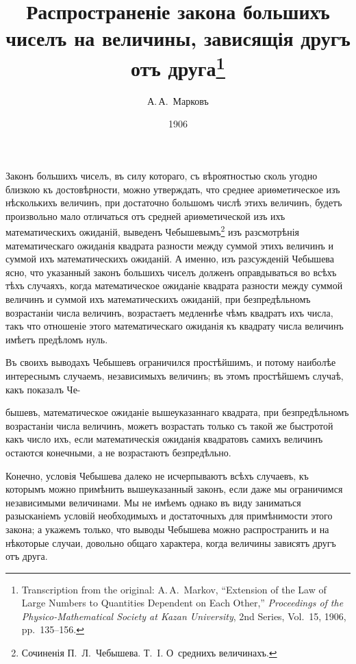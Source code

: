 \documentclass[12pt]{article}
\title{Распространеніе закона большихъ чиселъ на величины, зависящія другъ отъ друга\thanks{Transcription from the original: A.\,A.~Markov, ``Extension of the Law of Large Numbers to Quantities Dependent on Each Other,'' \textit{Proceedings of the Physico-Mathematical Society at Kazan University}, 2nd Series, Vol.~15, 1906, pp.~135--156.}}
\author{А.\,А.~Марковъ}
\date{1906}
\begin{document}
\maketitle



Законъ большихъ чиселъ, въ силу котораго, съ вѣроятностью сколь угодно близкою къ достовѣрности, можно утверждать, что среднее ариѳметическое изъ нѣсколькихъ величинъ, при достаточно большомъ числѣ этихъ величинъ, будетъ произвольно мало отличаться отъ средней ариѳметической изъ ихъ математическихъ ожиданій, выведенъ Чебышевымъ\footnote{Сочиненія П.~Л.~Чебышева. Т.~I. О~среднихъ величинахъ.} изъ разсмотрѣнія математическаго ожиданія квадрата разности между суммой этихъ величинъ и суммой ихъ математическихъ ожиданій. А именно, изъ разсужденій Чебышева ясно, что указанный законъ большихъ чиселъ долженъ оправдываться во всѣхъ тѣхъ случаяхъ, когда математическое ожиданіе квадрата разности между суммой величинъ и суммой ихъ математическихъ ожиданій, при безпредѣльномъ возрастаніи числа величинъ, возрастаетъ медленнѣе чѣмъ квадратъ ихъ числа, такъ что отношеніе этого математическаго ожиданія къ квадрату числа величинъ имѣетъ предѣломъ нуль.

Въ своихъ выводахъ Чебышевъ ограничился простѣйшимъ, и потому наиболѣе интереснымъ случаемъ, независимыхъ величинъ; въ этомъ простѣйшемъ случаѣ, какъ показалъ Че-


\noindent бышевъ, математическое ожиданіе вышеуказаннаго квадрата, при безпредѣльномъ возрастаніи числа величинъ, можетъ возрастать только съ такой же быстротой какъ число ихъ, если математическія ожиданія квадратовъ самихъ величинъ остаются конечными, а не возрастаютъ безпредѣльно.

Конечно, условія Чебышева далеко не исчерпываютъ всѣхъ случаевъ, къ которымъ можно примѣнить вышеуказанный законъ, если даже мы ограничимся независимыми величинами. Мы не имѣемъ однако въ виду заниматься разысканіемъ условій необходимыхъ и достаточныхъ для примѣнимости этого закона; а укажемъ только, что выводы Чебышева можно распространить и на нѣкоторые случаи, довольно общаго характера, когда величины зависятъ другъ отъ друга.
\end{document}

